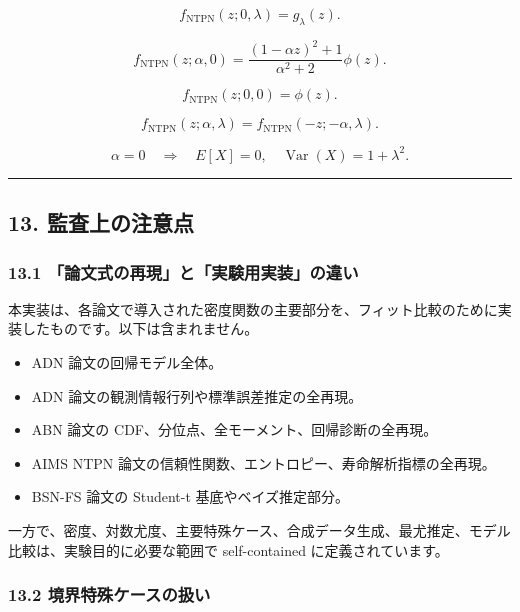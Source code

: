 \documentclass[
]{article}
\providecommand{\tightlist}{%
  \setlength{\itemsep}{0pt}\setlength{\parskip}{0pt}}
\begin{document}
\[
f_{\mathrm{NTPN}}(z;0,\lambda)=g_\lambda(z).
\]

\[
f_{\mathrm{NTPN}}(z;\alpha,0)
=\frac{(1-\alpha z)^2+1}{\alpha^2+2}\phi(z).
\]

\[
f_{\mathrm{NTPN}}(z;0,0)=\phi(z).
\]

\[
f_{\mathrm{NTPN}}(z;\alpha,\lambda)
=f_{\mathrm{NTPN}}(-z;-\alpha,\lambda).
\]

\[
\alpha=0
\quad\Rightarrow\quad
E[X]=0,\quad
\operatorname{Var}(X)=1+\lambda^2.
\]

\begin{center}\rule{0.5\linewidth}{0.5pt}\end{center}

\hypertarget{ux76e3ux67fbux4e0aux306eux6ce8ux610fux70b9}{%
\subsection{13.
監査上の注意点}\label{ux76e3ux67fbux4e0aux306eux6ce8ux610fux70b9}}

\hypertarget{ux8ad6ux6587ux5f0fux306eux518dux73feux3068ux5b9fux9a13ux7528ux5b9fux88c5ux306eux9055ux3044}{%
\subsubsection{13.1
「論文式の再現」と「実験用実装」の違い}\label{ux8ad6ux6587ux5f0fux306eux518dux73feux3068ux5b9fux9a13ux7528ux5b9fux88c5ux306eux9055ux3044}}

本実装は、各論文で導入された密度関数の主要部分を、フィット比較のために実装したものです。以下は含まれません。

\begin{itemize}
\tightlist
\item
  ADN 論文の回帰モデル全体。
\item
  ADN 論文の観測情報行列や標準誤差推定の全再現。
\item
  ABN 論文の CDF、分位点、全モーメント、回帰診断の全再現。
\item
  AIMS NTPN 論文の信頼性関数、エントロピー、寿命解析指標の全再現。
\item
  BSN-FS 論文の Student-t 基底やベイズ推定部分。
\end{itemize}

一方で、密度、対数尤度、主要特殊ケース、合成データ生成、最尤推定、モデル比較は、実験目的に必要な範囲で
self-contained に定義されています。

\hypertarget{ux5883ux754cux7279ux6b8aux30b1ux30fcux30b9ux306eux6271ux3044}{%
\subsubsection{13.2
境界特殊ケースの扱い}\label{ux5883ux754cux7279ux6b8aux30b1ux30fcux30b9ux306eux6271ux3044}}
\end{document}

